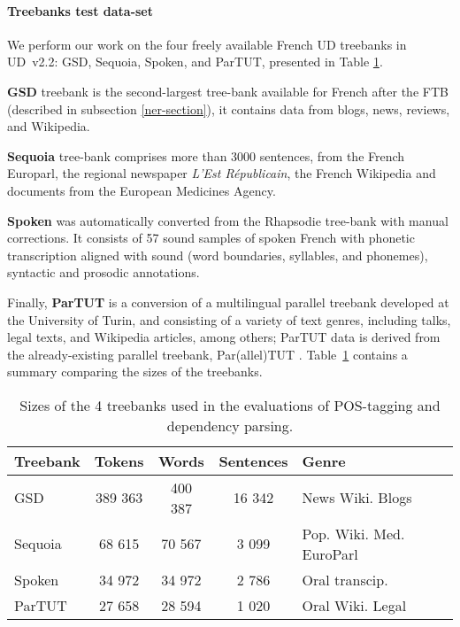 \paragraph{Treebanks test data-set}
We perform our work on the four freely available French UD treebanks in UD~v2.2: GSD, Sequoia, Spoken, and ParTUT, presented in Table \ref{treebanks-tab-cabernet}.

\textbf{GSD} treebank \citep{mcdonald-etal-2013-universal} is the second-largest tree-bank available for French after the FTB (described in subsection \ref{ner-section}), it contains data from blogs, news, reviews, and Wikipedia.

\textbf{Sequoia} tree-bank %
\citep{candito-etal-2014-deep} comprises more than 3000 sentences, from the French Europarl, the regional newspaper \emph{L’Est Républicain}, the French Wikipedia and documents from the European Medicines Agency.

\textbf{Spoken} was automatically converted from the Rhapsodie tree-bank  %
\citep{lacheret-etal-2014-rhapsodie} with manual corrections. It consists of 57 sound samples of spoken French with phonetic transcription aligned with sound (word boundaries, syllables, and phonemes), syntactic and prosodic annotations.

Finally, \textbf{ParTUT} is a conversion of a multilingual parallel treebank developed at the University of Turin, and consisting of a variety of text genres, including talks, legal texts, and Wikipedia articles, among others; ParTUT data is derived from the already-existing parallel treebank, Par(allel)TUT \citep{sanguinetti-Bosco-2015-parttut}. Table~\ref{treebanks-tab-cabernet} contains a summary comparing the sizes of the treebanks.%

\begin{table}
    \centering
    \begin{tabular}{lcccl}
        \toprule
        Treebank & Tokens  & Words   & Sentences & Genre                    \\
        \midrule
        GSD      & 389 363 & 400 387 & 16 342    & News Wiki. Blogs         \\
        Sequoia  & 68 615  & 70 567  & 3 099     & Pop. Wiki. Med. EuroParl \\
        Spoken   & 34 972  & 34 972  & 2 786     & Oral transcip.           \\
        ParTUT   & 27 658  & 28 594  & 1 020     & Oral Wiki. Legal         \\
        \bottomrule
    \end{tabular}
    \caption{Sizes of the 4 treebanks used in the evaluations of POS-tagging and dependency parsing. \label{treebanks-tab-cabernet}}
\end{table}

